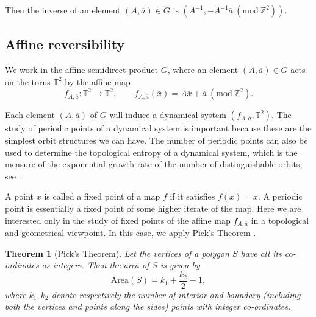 \documentclass[12pt]{amsart}
\theoremstyle{plain}
\newtheorem{theorem}{Theorem}[section]
\theoremstyle{definition}
\theoremstyle{remark}
\begin{document}
Then the inverse of an element $(A,\overline{a})\in G$ is $(A^{-1},-A^{-1}\overline{a} ~(\text{mod}~\mathbb{Z}^2))$. 

\subsection{Affine reversibility}

We work in the affine semidirect product $G$, where an element \((A,\overline{a})\in G\) acts on the torus \(\mathbb{T}^2\)
by the affine map
$$
f_{A,\overline{a}} : \mathbb{T}^2 \longrightarrow \mathbb{T}^2,\qquad
f_{A,\overline{a}}(\bar{x})=A\bar{x}+\overline{a} ~(\text{mod}~\mathbb{Z}^2).
$$


Each element $(A,\overline{a})$ of $G$ will induce a dynamical system $(f_{A,\overline{a}},\mathbb{T}^2).$ The study of periodic points of a dynamical system is important because these are the simplest orbit structures we can have. The number of periodic points can also be used to determine the topological entropy of a dynamical system, which is the measure of the exponential growth rate of the number of distinguishable orbits, see \cite{BS}. 

A point $x$ is called a fixed point of a map $f$ if it satisfies $f(x)=x$. A periodic point is essentially a fixed point of some higher iterate of the map. Here we are interested only in the study of fixed points of the affine map $f_{A,\overline{a}} $ in a topological and geometrical viewpoint. In this case, we apply Pick’s Theorem \cite{GP}.

\begin{theorem}[Pick's Theorem]
Let the vertices of a polygon $S$ have all its co-ordinates as integers. Then the area of $S$ is given by \[\text{Area}(S)=k_1+\frac{k_2}{2}-1,\] where $k_1, k_2$ denote respectively the number of interior and boundary (including both the vertices and points along the sides) points with integer co-ordinates.     
\end{theorem}
\end{document}
